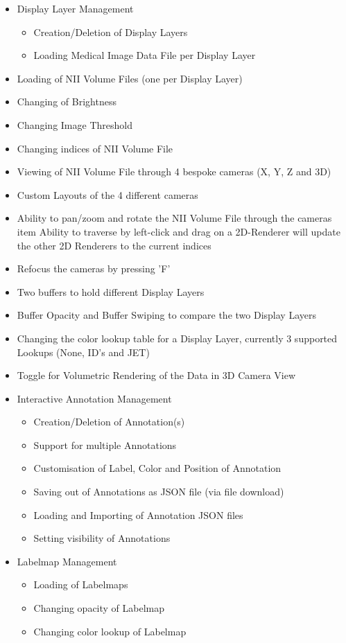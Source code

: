 \documentclass[a4paper,11pt,titlepage]{article}
\begin{document}
\begin{itemize}
  \item Display Layer Management
\begin{itemize}
\item Creation/Deletion of Display Layers
\item Loading Medical Image Data File per Display Layer
\end{itemize}


\item Loading of NII Volume Files (one per Display Layer)	
  \item Changing of Brightness
 \item Changing Image Threshold
\item Changing indices of NII Volume File
\item Viewing of NII Volume File through 4 bespoke cameras (X, Y, Z and 3D)
\item Custom Layouts of the 4 different cameras
\item Ability to pan/zoom and rotate the NII Volume File through the cameras
item Ability to traverse by left-click and drag on a 2D-Renderer will update the other 2D Renderers to the current indices
\item Refocus the cameras by pressing 'F'
\item Two buffers to hold different Display Layers
\item Buffer Opacity and Buffer Swiping to compare the two Display Layers
\item Changing the color lookup table for a Display Layer, currently 3 supported Lookups (None, ID's and JET)
\item Toggle for Volumetric Rendering of the Data in 3D Camera View
\item Interactive Annotation Management
\begin{itemize}
\item Creation/Deletion of Annotation(s)
\item Support for multiple Annotations
\item Customisation of Label, Color and Position of Annotation
\item Saving out of Annotations as JSON file (via file download)
\item Loading and Importing of Annotation JSON files
\item Setting visibility of Annotations
\end{itemize}
\item Labelmap Management

\begin{itemize}
\item Loading of Labelmaps
\item Changing opacity of Labelmap
\item Changing color lookup of Labelmap
\end{itemize}

\end{itemize}
\end{document}
